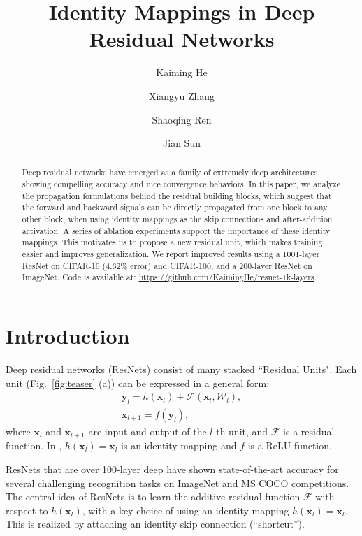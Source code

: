 \documentclass[runningheads]{llncs}
\newcommand{\ve}[1]{\mathbf{#1}} \newcommand{\ma}[1]{\mathrm{#1}}
\begin{document}
\pagestyle{headings}
\mainmatter

\title{Identity Mappings in Deep Residual Networks}

\titlerunning{~}

\authorrunning{~}

\author{Kaiming He \and Xiangyu Zhang \and Shaoqing Ren \and Jian Sun}


\maketitle

\begin{abstract}
Deep residual networks \cite{He2016} have emerged as a family of extremely deep architectures showing compelling accuracy and nice convergence behaviors. In this paper, we analyze the propagation formulations behind the residual building blocks, which suggest that the forward and backward signals can be directly propagated from one block to any other block, when using identity mappings as the skip connections and after-addition activation. A series of ablation experiments support the importance of these identity mappings. This motivates us to propose a new residual unit, which makes training easier and improves generalization. We report improved results using a 1001-layer ResNet on CIFAR-10 (4.62\% error) and CIFAR-100,  and a 200-layer ResNet on ImageNet. Code is available at: \url{https://github.com/KaimingHe/resnet-1k-layers}.
\end{abstract}


\hypersetup{urlcolor=black}

\section{Introduction}
Deep residual networks (ResNets) \cite{He2016} consist of many stacked ``Residual Units". Each unit (Fig.~\ref{fig:teaser} (a)) can be expressed in a general form:
\begin{gather}
\ve{y}_{l} = h(\ve{x}_{l}) + \mathcal{F}(\ve{x}_{l}, \mathcal{W}_l), \nonumber\\
\ve{x}_{l+1} = f(\ve{y}_{l}) \nonumber,
\end{gather}
where $\ve{x}_{l}$ and $\ve{x}_{l+1}$ are input and output of the $l$-th unit, and $\mathcal{F}$ is a residual function. In \cite{He2016}, $h(\ve{x}_{l}) = \ve{x}_{l}$ is an identity mapping and $f$ is a ReLU \cite{Nair2010} function.

ResNets that are over 100-layer deep have shown state-of-the-art accuracy for several challenging recognition tasks on ImageNet \cite{Russakovsky2015} and MS COCO \cite{Lin2014} competitions. The central idea of ResNets is to learn the additive residual function $\mathcal{F}$ with respect to $h(\ve{x}_{l})$, with a key choice of using an identity mapping $h(\ve{x}_{l}) = \ve{x}_{l}$. This is realized by attaching an identity skip connection (``shortcut'').
\end{document}
